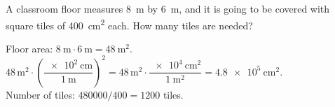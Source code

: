 \begin{exercise}
    A classroom floor measures \qty{8}{\m} by \qty{6}{\m}, and it is going to be covered with square tiles of \qty{400}{\square\cm} each. How many tiles are needed?
    \begin{solu}
        Floor area: \(\qty{8}{\m} \cdot \qty{6}{\m} = \qty{48}{\square\m}\). \\
        \(\num{48}\,\unit{\square\m} \cdot \left(\dfrac{\qty{e2}{\cm}}{\qty{1}{\m}}\right)^{2} = \num{48}\,\unit{\square\m} \cdot \dfrac{\qty{e4}{\square\cm}}{\qty{1}{\square\m}} = \qty{4.8e5}{\square\cm}\). \\
        Number of tiles: \(\num{480000} / \num{400} = \num{1200}\) tiles.
    \end{solu}
\end{exercise}

